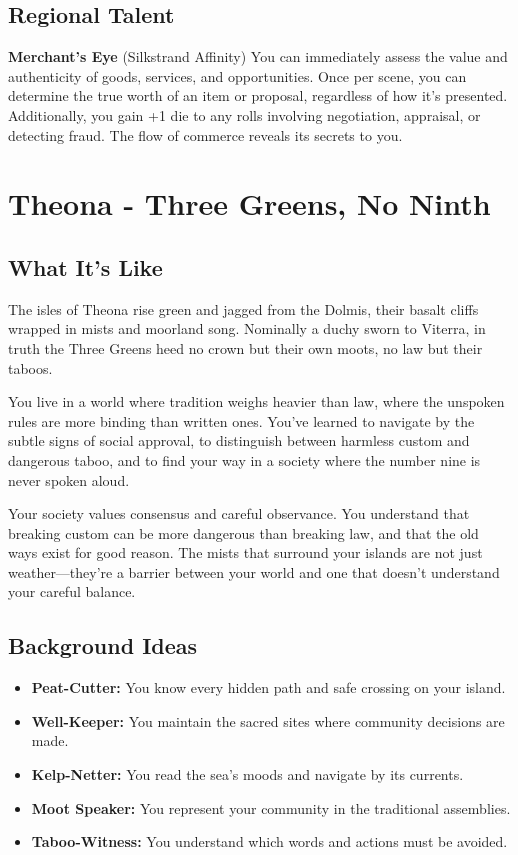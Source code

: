 \documentclass[11pt]{article}
\newcommand{\region}[1]{\section*{#1}}
\newcommand{\subregion}[1]{\subsection*{#1}}
\begin{document}
\begin{multicols}{2}
\subregion{Regional Talent}

\textbf{Merchant's Eye} (Silkstrand Affinity)
You can immediately assess the value and authenticity of goods, services, and opportunities. Once per scene, you can determine the true worth of an item or proposal, regardless of how it's presented. Additionally, you gain +1 die to any rolls involving negotiation, appraisal, or detecting fraud. The flow of commerce reveals its secrets to you.

\end{multicols}

\region{Theona - Three Greens, No Ninth}

\begin{multicols}{2}
\subregion{What It's Like}

The isles of Theona rise green and jagged from the Dolmis, their basalt cliffs wrapped in mists and moorland song. Nominally a duchy sworn to Viterra, in truth the Three Greens heed no crown but their own moots, no law but their taboos.

You live in a world where tradition weighs heavier than law, where the unspoken rules are more binding than written ones. You've learned to navigate by the subtle signs of social approval, to distinguish between harmless custom and dangerous taboo, and to find your way in a society where the number nine is never spoken aloud.

Your society values consensus and careful observance. You understand that breaking custom can be more dangerous than breaking law, and that the old ways exist for good reason. The mists that surround your islands are not just weather—they're a barrier between your world and one that doesn't understand your careful balance.

\columnbreak

\subregion{Background Ideas}

\begin{itemize}[leftmargin=*]
    \item \textbf{Peat-Cutter:} You know every hidden path and safe crossing on your island.
    \item \textbf{Well-Keeper:} You maintain the sacred sites where community decisions are made.
    \item \textbf{Kelp-Netter:} You read the sea's moods and navigate by its currents.
    \item \textbf{Moot Speaker:} You represent your community in the traditional assemblies.
    \item \textbf{Taboo-Witness:} You understand which words and actions must be avoided.
\end{itemize}


\end{multicols}
\end{document}
